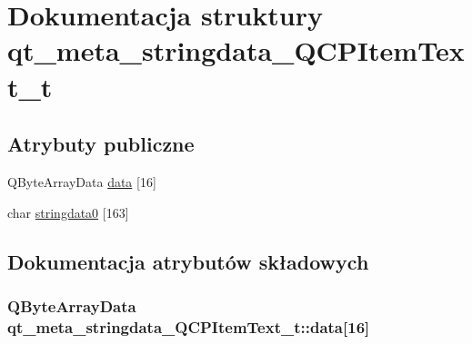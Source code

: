 \hypertarget{structqt__meta__stringdata___q_c_p_item_text__t}{}\section{Dokumentacja struktury qt\+\_\+meta\+\_\+stringdata\+\_\+\+Q\+C\+P\+Item\+Text\+\_\+t}
\label{structqt__meta__stringdata___q_c_p_item_text__t}
\subsection*{Atrybuty publiczne}
\begin{DoxyCompactItemize}
\item 
Q\+Byte\+Array\+Data \hyperlink{structqt__meta__stringdata___q_c_p_item_text__t_a130c44d0975b8c3615445811c48edcab}{data} \mbox{[}16\mbox{]}
\item 
char \hyperlink{structqt__meta__stringdata___q_c_p_item_text__t_ab2e92c59ac0dced63f1fc1f4cc75cbc7}{stringdata0} \mbox{[}163\mbox{]}
\end{DoxyCompactItemize}


\subsection{Dokumentacja atrybutów składowych}
\subsubsection[{\texorpdfstring{data}{data}}]{\setlength{\rightskip}{0pt plus 5cm}Q\+Byte\+Array\+Data qt\+\_\+meta\+\_\+stringdata\+\_\+\+Q\+C\+P\+Item\+Text\+\_\+t\+::data\mbox{[}16\mbox{]}}\hypertarget{structqt__meta__stringdata___q_c_p_item_text__t_a130c44d0975b8c3615445811c48edcab}{}\label{structqt__meta__stringdata___q_c_p_item_text__t_a130c44d0975b8c3615445811c48edcab}
